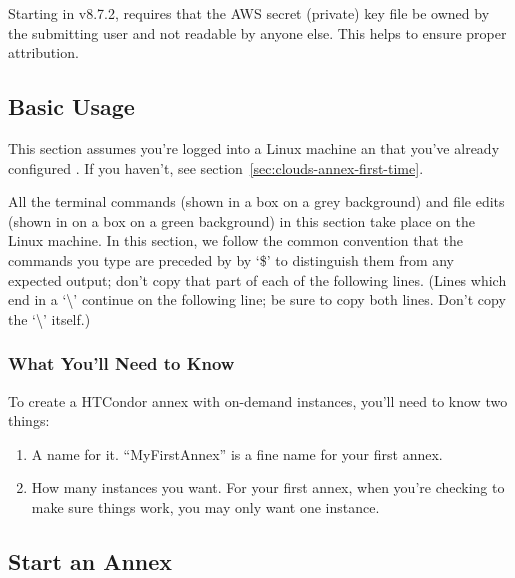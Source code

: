 Starting in v8.7.2,  requires that the AWS secret (private) key file
be owned by the submitting user and not readable by anyone else.  This
helps to ensure proper attribution.

\subsection{Basic Usage}


This section assumes you're logged into a Linux machine an that you've
already configured .  If you haven't, see
section~\ref{sec:clouds-annex-first-time}.

All the terminal commands (shown in a box on a grey background) and file edits
(shown in on a box on a green background) in this section take place on the
Linux machine.  In this section, we follow the common convention that
the commands you type are preceded by by `\$' to distinguish them from any
expected output; don't copy that part of each of the following lines.
(Lines which end in a `\textbackslash' continue on the following line; be
sure to copy both lines.  Don't copy the `\textbackslash' itself.)

\subsubsection{What You'll Need to Know}

To create a HTCondor annex with on-demand instances, you'll need to know two
things:

\begin{enumerate}
\item A name for it.  ``MyFirstAnnex'' is a fine name for your first annex.
\item How many instances you want.  For your first annex, when you're checking to make sure things work, you may only want one instance.
\end{enumerate}

\subsection{Start an Annex}

